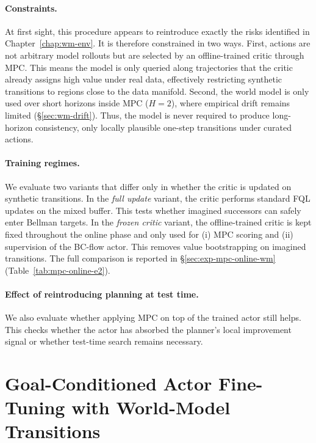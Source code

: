 \paragraph{Constraints.}
At first sight, this procedure appears to reintroduce exactly the risks
identified in Chapter~\ref{chap:wm-env}. It is therefore constrained in
two ways.
First, actions are not arbitrary model rollouts but are selected by an
offline-trained critic through MPC. This means the model is only queried
along trajectories that the critic already assigns high value under real
data, effectively restricting synthetic transitions to regions close to
the data manifold.
Second, the world model is only used over short horizons inside MPC
($H=2$), where empirical drift remains limited (\S\ref{sec:wm-drift}).
Thus, the model is never required to produce long-horizon consistency,
only locally plausible one-step transitions under curated actions.

\paragraph{Training regimes.}
We evaluate two variants that differ only in whether the critic is
updated on synthetic transitions.
In the \emph{full update} variant, the critic performs standard FQL
updates on the mixed buffer. This tests whether imagined successors can
safely enter Bellman targets.
In the \emph{frozen critic} variant, the offline-trained critic is kept
fixed throughout the online phase and only used for (i) MPC scoring and
(ii) supervision of the BC-flow actor. This removes value
bootstrapping on imagined transitions. The full comparison is reported
in \S\ref{sec:exp-mpc-online-wm}
(Table~\ref{tab:mpc-online-e2}).

\paragraph{Effect of reintroducing planning at test time.}
We also evaluate whether applying MPC on top of the trained actor still
helps. This checks whether the actor has absorbed the planner's local
improvement signal or whether test-time search remains necessary.

\section{Goal-Conditioned Actor Fine-Tuning with World-Model Transitions}
\label{sec:mpcd-gc}

